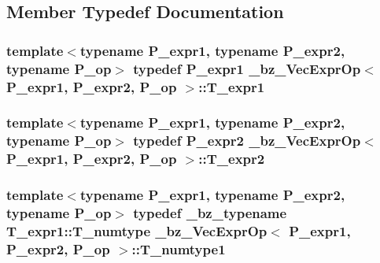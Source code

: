 \subsection{Member Typedef Documentation}
\hypertarget{class__bz__VecExprOp_a9607226603810860fe37bed664ea50b3}{}
\subsubsection[{T\+\_\+expr1}]{\setlength{\rightskip}{0pt plus 5cm}template$<$typename P\+\_\+expr1, typename P\+\_\+expr2, typename P\+\_\+op$>$ typedef P\+\_\+expr1 {\bf \+\_\+bz\+\_\+\+Vec\+Expr\+Op}$<$ P\+\_\+expr1, P\+\_\+expr2, P\+\_\+op $>$\+::{\bf T\+\_\+expr1}}\label{class__bz__VecExprOp_a9607226603810860fe37bed664ea50b3}
\hypertarget{class__bz__VecExprOp_ad69392f01f10ddeab59e0aece0e942ff}{}
\subsubsection[{T\+\_\+expr2}]{\setlength{\rightskip}{0pt plus 5cm}template$<$typename P\+\_\+expr1, typename P\+\_\+expr2, typename P\+\_\+op$>$ typedef P\+\_\+expr2 {\bf \+\_\+bz\+\_\+\+Vec\+Expr\+Op}$<$ P\+\_\+expr1, P\+\_\+expr2, P\+\_\+op $>$\+::{\bf T\+\_\+expr2}}\label{class__bz__VecExprOp_ad69392f01f10ddeab59e0aece0e942ff}
\hypertarget{class__bz__VecExprOp_a5d79220111e0ccb5eba1a38fe56a84da}{}
\subsubsection[{T\+\_\+numtype1}]{\setlength{\rightskip}{0pt plus 5cm}template$<$typename P\+\_\+expr1, typename P\+\_\+expr2, typename P\+\_\+op$>$ typedef {\bf \+\_\+bz\+\_\+typename} T\+\_\+expr1\+::\+T\+\_\+numtype {\bf \+\_\+bz\+\_\+\+Vec\+Expr\+Op}$<$ P\+\_\+expr1, P\+\_\+expr2, P\+\_\+op $>$\+::{\bf T\+\_\+numtype1}}\label{class__bz__VecExprOp_a5d79220111e0ccb5eba1a38fe56a84da}
\hypertarget{class__bz__VecExprOp_a0fb2e4b1c56e90377f43ace8fff224a0}{}
